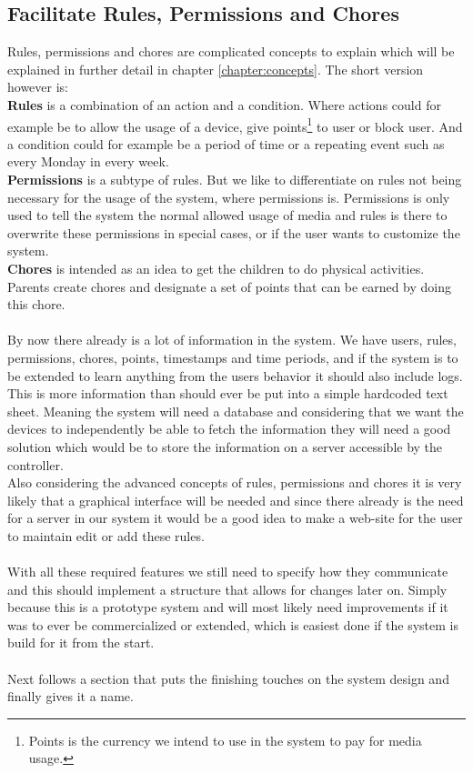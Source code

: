 \subsection{Facilitate Rules, Permissions and Chores}
Rules, permissions and chores are complicated concepts to explain which will be explained in further detail in chapter \ref{chapter:concepts}. The short version however is:\\
\textbf{Rules} is a combination of an action and a condition. Where actions could for example be to allow the usage of a device, give points\footnote{Points is the currency we intend to use in the system to pay for media usage.} to user or block user. And a condition could for example be a period of time or a repeating event such as every Monday in every week.\\
\textbf{Permissions} is a subtype of rules. But we like to differentiate on rules not being necessary for the usage of the system, where permissions is. Permissions is only used to tell the system the normal allowed usage of media and rules is there to overwrite these permissions in special cases, or if the user wants to customize the system.\\
\textbf{Chores} is intended as an idea to get the children to do physical activities. Parents create chores and designate a set of points that can be earned by doing this chore.\\
\\
By now there already is a lot of information in the system. We have users, rules, permissions, chores, points, timestamps and time periods, and if the system is to be extended to learn anything from the users behavior it should also include logs.\\
This is more information than should ever be put into a simple hardcoded text sheet. Meaning the system will need a database and considering that we want the devices to independently be able to fetch the information they will need a good solution which would be to store the information on a server accessible by the controller.\\
Also considering the advanced concepts of rules, permissions and chores it is very likely that a graphical interface will be needed and since there already is the need for a server in our system it would be a good idea to make a web-site for the user to maintain edit or add these rules.\\
\\
With all these required features we still need to specify how they communicate and this should implement a structure that allows for changes later on. Simply because this is a prototype system and will most likely need improvements if it was to ever be commercialized or extended, which is easiest done if the system is build for it from the start.\\
\\
Next follows a section that puts the finishing touches on the system design and finally gives it a name.


